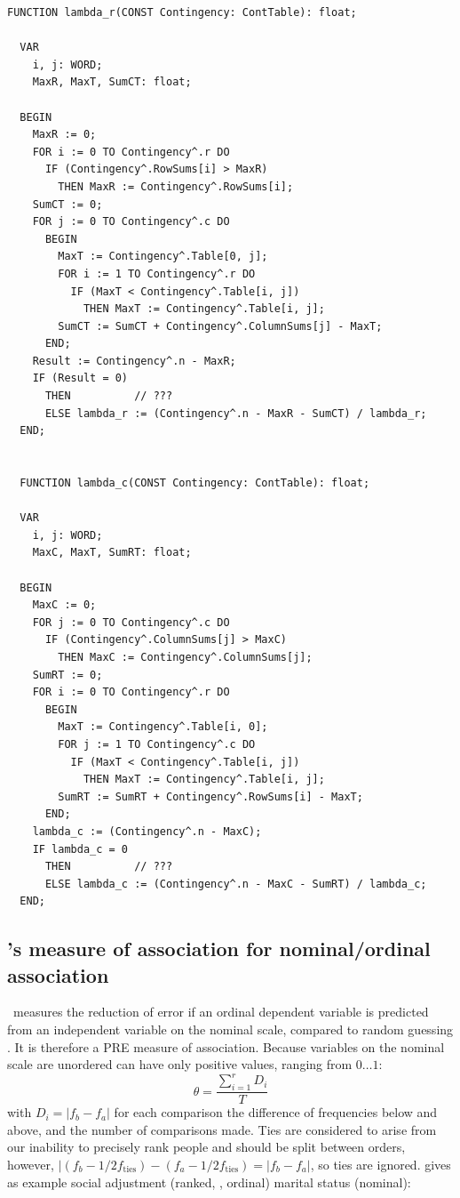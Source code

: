 \begin{refsection}
\begin{lstlisting}[caption=\Name{Guttman}'s asymmetrical and symmetrical \skalar{\lambda}]
  FUNCTION lambda_r(CONST Contingency: ContTable): float;

  VAR
    i, j: WORD;
    MaxR, MaxT, SumCT: float;

  BEGIN
    MaxR := 0;
    FOR i := 0 TO Contingency^.r DO
      IF (Contingency^.RowSums[i] > MaxR)
        THEN MaxR := Contingency^.RowSums[i];
    SumCT := 0;
    FOR j := 0 TO Contingency^.c DO
      BEGIN
        MaxT := Contingency^.Table[0, j];
        FOR i := 1 TO Contingency^.r DO
          IF (MaxT < Contingency^.Table[i, j])
            THEN MaxT := Contingency^.Table[i, j];
        SumCT := SumCT + Contingency^.ColumnSums[j] - MaxT;
      END;
    Result := Contingency^.n - MaxR;
    IF (Result = 0)
      THEN          // ???
      ELSE lambda_r := (Contingency^.n - MaxR - SumCT) / lambda_r;
  END;


  FUNCTION lambda_c(CONST Contingency: ContTable): float;

  VAR
    i, j: WORD;
    MaxC, MaxT, SumRT: float;

  BEGIN
    MaxC := 0;
    FOR j := 0 TO Contingency^.c DO
      IF (Contingency^.ColumnSums[j] > MaxC)
        THEN MaxC := Contingency^.ColumnSums[j];
    SumRT := 0;
    FOR i := 0 TO Contingency^.r DO
      BEGIN
        MaxT := Contingency^.Table[i, 0];
        FOR j := 1 TO Contingency^.c DO
          IF (MaxT < Contingency^.Table[i, j])
            THEN MaxT := Contingency^.Table[i, j];
        SumRT := SumRT + Contingency^.RowSums[i] - MaxT;
      END;
    lambda_c := (Contingency^.n - MaxC);
    IF lambda_c = 0
      THEN          // ???
      ELSE lambda_c := (Contingency^.n - MaxC - SumRT) / lambda_c;
  END;
\end{lstlisting}


\subsection{'s measure of association \skalar{\theta} for nominal/ordinal association}

\skalar{\theta}\ measures the reduction of error if an ordinal dependent variable is predicted from an independent variable on the nominal scale, compared to random guessing \parencite{Fre-65,Fre-76}. It is therefore a PRE measure of association. Because variables on the nominal scale are unordered \skalar{\theta} can have only positive values, ranging from \(0\ldots 1 \):
\begin{equation}
  \theta = \frac{\sum_{i=1}^{r}{D_i}}{T}
\end{equation}
with \(D_i = |f_b - f_a| \) for each comparison the difference of frequencies below and above, and  the number of comparisons made. Ties are considered to arise from our inability to precisely rank people and should be split between orders, however, \(|(f_b - 1/2 f_\mathrm{ties}) - (f_a - 1/2 f_\mathrm{ties}) = |f_b - f_a| \), so ties are ignored. \parencite{Fre-65} gives as example social adjustment (ranked, , ordinal)  marital status (nominal):


\end{refsection}

